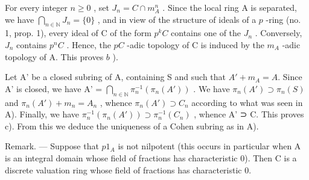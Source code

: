For every integer \(n \geqslant 0\) , set \(J_{n} = C \cap m_{A}^{n}\) . Since the local ring A is separated, we have \(\bigcap_{n \in \mathbb{N}} J_{n} = \{0\}\) , and in view of the structure of ideals of a \(p\) -ring (no. 1, prop. 1), every ideal of C of the form \(p^{k}C\) contains one of the \(J_{n}\) . Conversely, \(J_{n}\) contains \(p^{n}C\) . Hence, the \(pC\) -adic topology of C is induced by the \(m_{A}\) -adic topology of A. This proves \(b\) ).

Let A' be a closed subring of A, containing S and such that \(A' + m_{A} = A\). Since A' is closed, we have A' = \(\bigcap_{n\in\mathbb{N}}\pi_n^{-1}(\pi_n(A'))\) . We have \(\pi_n(A') \supset \pi_n(S)\) and \(\pi_n(A') + m_n = A_n\) , whence \(\pi_n(A') \supset C_n\) according to what was seen in A). Finally, we have \(\pi_n^{-1}(\pi_n(A')) \supset \pi_n^{-1}(C_n)\) , whence A' ⊃ C. This proves c). From this we deduce the uniqueness of a Cohen subring as in A).

Remark. --- Suppose that \(p1_{A}\) is not nilpotent (this occurs in particular when A is an integral domain whose field of fractions has characteristic 0). Then C is a discrete valuation ring whose field of fractions has characteristic 0.

